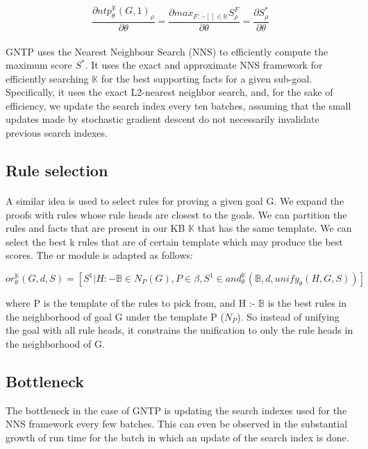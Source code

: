 \documentclass[Other]{iitddiss}
\begin{document}
\[ \frac { \partial ntp_{\theta}^{\mathbb{K}}(G, 1)_{\rho}}{\partial \theta} = \frac {\partial max_{F:- [ ] \in \mathbb{K}} S_{\rho}^{F}}{\partial \theta} = \frac {\partial S_{\rho}^{*}}{\partial \theta} \]


\paragraph{}
GNTP uses the Nearest Neighbour Search (NNS) to efficiently compute the maximum score $S^*$. It uses the exact and approximate NNS framework for efficiently searching $\mathbb{K}$ for the best supporting facts for a given sub-goal. Specifically, it uses the exact L2-nearest neighbor search, and, for the sake of efficiency, we update the search index every ten batches, assuming that the small updates made by stochastic gradient descent do not necessarily invalidate previous search indexes.

\subsection{Rule selection}
\paragraph{}
A similar idea is used to select rules for proving a given goal G. We expand the proofs with rules whose rule heads are closest to the goals. We can partition the rules and facts that are present in our KB $\mathbb{K}$ that has the same template. We can select the best k rules that are of certain template which may produce the best scores. The or module is adapted as follows:

\[ or_{\theta}^{\mathbb{K}}(G, d, S) = [ S^1 | H :- \mathbb{B} \in N_{P}(G), P \in \beta, S^1 \in and_{\theta}^{\mathbb{K}}(\mathbb{B}, d, unify_{\theta}(H, G, S)) ] \]

where P is the template of the rules to pick from, and H :- $\mathbb{B}$ is the best rules in the neighborhood of goal G under the template P ($N_P$). So instead of unifying the goal with all rule heads, it constrains the unification to only the rule heads in the neighborhood of G.

\subsection{Bottleneck}
The bottleneck in the case of GNTP is updating the search indexes used for the NNS framework every few batches. This can even be observed in the substantial growth of run time for the batch in which an update of the search index is done.
\end{document}
